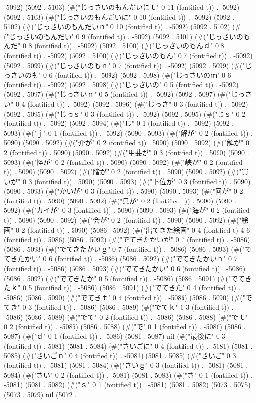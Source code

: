 -5092) (5092 . 5103) (#("じっさいのもんだいにｔ" 0 11 (fontified t)) . -5092) (5092 . 5103) (#("じっさいのもんだいに" 0 10 (fontified t)) . -5092) (5092 . 5102) (#("じっさいのもんだいｎ" 0 10 (fontified t)) . -5092) (5092 . 5102) (#("じっさいのもんだい" 0 9 (fontified t)) . -5092) (5092 . 5101) (#("じっさいのもんだ" 0 8 (fontified t)) . -5092) (5092 . 5100) (#("じっさいのもんｄ" 0 8 (fontified t)) . -5092) (5092 . 5100) (#("じっさいのもん" 0 7 (fontified t)) . -5092) (5092 . 5099) (#("じっさいのもｎ" 0 7 (fontified t)) . -5092) (5092 . 5099) (#("じっさいのも" 0 6 (fontified t)) . -5092) (5092 . 5098) (#("じっさいのｍ" 0 6 (fontified t)) . -5092) (5092 . 5098) (#("じっさいの" 0 5 (fontified t)) . -5092) (5092 . 5097) (#("じっさいｎ" 0 5 (fontified t)) . -5092) (5092 . 5097) (#("じっさい" 0 4 (fontified t)) . -5092) (5092 . 5096) (#("じっさ" 0 3 (fontified t)) . -5092) (5092 . 5095) (#("じっｓ" 0 3 (fontified t)) . -5092) (5092 . 5095) (#("じｓ" 0 2 (fontified t)) . -5092) (5092 . 5094) (#("じ" 0 1 (fontified t)) . -5092) (5092 . 5093) (#("ｊ" 0 1 (fontified t)) . -5092) (5090 . 5093) (#("解が" 0 2 (fontified t)) . 5090) (5090 . 5092) (#("介が" 0 2 (fontified t)) . 5090) (5090 . 5092) (#("解が" 0 2 (fontified t)) . 5090) (5090 . 5092) (#("甲斐が" 0 3 (fontified t)) . 5090) (5090 . 5093) (#("怪が" 0 2 (fontified t)) . 5090) (5090 . 5092) (#("峡が" 0 2 (fontified t)) . 5090) (5090 . 5092) (#("階が" 0 2 (fontified t)) . 5090) (5090 . 5092) (#("買いが" 0 3 (fontified t)) . 5090) (5090 . 5093) (#("下位が" 0 3 (fontified t)) . 5090) (5090 . 5093) (#("かいが" 0 3 (fontified t)) . 5090) (5090 . 5093) (#("回が" 0 2 (fontified t)) . 5090) (5090 . 5092) (#("貝が" 0 2 (fontified t)) . 5090) (5090 . 5092) (#("カイが" 0 3 (fontified t)) . 5090) (5090 . 5093) (#("海が" 0 2 (fontified t)) . 5090) (5090 . 5092) (#("会が" 0 2 (fontified t)) . 5090) (5090 . 5092) (#("絵画" 0 2 (fontified t)) . 5090) (5086 . 5092) (#("出てきた絵画" 0 4 (fontified t) 4 6 (fontified t)) . 5086) (5086 . 5092) (#("でてきたかいが" 0 7 (fontified t)) . -5086) (5086 . 5093) (#("でてきたかいｇ" 0 7 (fontified t)) . -5086) (5086 . 5093) (#("でてきたかい" 0 6 (fontified t)) . -5086) (5086 . 5092) (#("でてきたかいｈ" 0 7 (fontified t)) . -5086) (5086 . 5093) (#("でてきたかい" 0 6 (fontified t)) . -5086) (5086 . 5092) (#("でてきたか" 0 5 (fontified t)) . -5086) (5086 . 5091) (#("でてきたｋ" 0 5 (fontified t)) . -5086) (5086 . 5091) (#("でてきた" 0 4 (fontified t)) . -5086) (5086 . 5090) (#("でてきｔ" 0 4 (fontified t)) . -5086) (5086 . 5090) (#("でてき" 0 3 (fontified t)) . -5086) (5086 . 5089) (#("でてｋ" 0 3 (fontified t)) . -5086) (5086 . 5089) (#("でて" 0 2 (fontified t)) . -5086) (5086 . 5088) (#("でｔ" 0 2 (fontified t)) . -5086) (5086 . 5088) (#("で" 0 1 (fontified t)) . -5086) (5086 . 5087) (#("ｄ" 0 1 (fontified t)) . -5086) (5081 . 5087) nil (#("最後に" 0 3 (fontified t)) . 5081) (5081 . 5084) (#("さいごに" 0 4 (fontified t)) . -5081) (5081 . 5085) (#("さいごｎ" 0 4 (fontified t)) . -5081) (5081 . 5085) (#("さいご" 0 3 (fontified t)) . -5081) (5081 . 5084) (#("さいｇ" 0 3 (fontified t)) . -5081) (5081 . 5084) (#("さい" 0 2 (fontified t)) . -5081) (5081 . 5083) (#("さ" 0 1 (fontified t)) . -5081) (5081 . 5082) (#("ｓ" 0 1 (fontified t)) . -5081) (5081 . 5082) (5073 . 5075) (5073 . 5079) nil (5072 . 